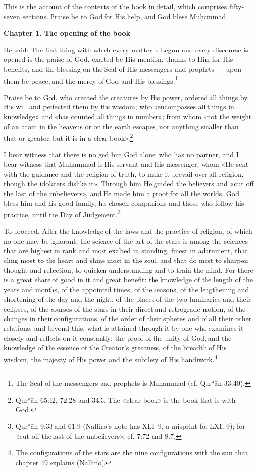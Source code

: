 \documentclass[11pt]{article}
\newcommand{\ArPage}[1]{\marginpar{\footnotesize\color{gray}Ar.\,p.\,#1}}
\newcommand{\ChapterHead}[4]{\par\needspace{8\baselineskip}\bigskip\pdfbookmark[1]{#1}{ch-#2}\hypertarget{EN-C#2}{}%
 {\large\bfseries\interlinepenalty=10000 #1#4{\normalfont\normalsize#3}\par}\nobreak\medskip}
\begin{document}
\par This is the account of the contents of the book in detail, which comprises fifty-seven sections. Praise be to God for His help, and God bless Muḥammad.\par
\ChapterHead{Chapter 1. The opening of the book}{01}{\ArPage{6}}{}
\par He said: The first thing with which every matter is begun and every discourse is opened is the praise of God, exalted be His mention, thanks to Him for His benefits, and the blessing on the Seal of His messengers and prophets — upon them be peace, and the mercy of God and His blessings.\footnote{The Seal of the messengers and prophets is Muḥammad (cf. Qurʾān 33:40).}\par
\par Praise be to God, who created the creatures by His power, ordered all things by His will and perfected them by His wisdom; who «encompasses all things in knowledge» and «has counted all things in number»; from whom «not the weight of an atom in the heavens or on the earth escapes, nor anything smaller than that or greater, but it is in a clear book».\footnote{Qurʾān 65:12, 72:28 and 34:3. The «clear book» is the book that is with God.}\par
\par I bear witness that there is no god but God alone, who has no partner, and I bear witness that Muḥammad is His servant and His messenger, whom «He sent with the guidance and the religion of truth, to make it prevail over all religion, though the idolaters dislike it». Through him He guided the believers and «cut off the last of the unbelievers», and He made him a proof for all the worlds. God bless him and his good family, his chosen companions and those who follow his practice, until the Day of Judgement.\footnote{Qurʾān 9:33 and 61:9 (Nallino's note has XLI, 9, a misprint for LXI, 9); for «cut off the last of the unbelievers», cf. 7:72 and 8:7.}\par
\par To proceed. After the knowledge of the laws and the practice of religion, of which no one may be ignorant, the science of the art of the stars is among the sciences that are highest in rank and most exalted in standing, finest in adornment, that cling most to the heart and shine most in the soul, and that do most to sharpen thought and reflection, to quicken understanding and to train the mind. For there is a great share of good in it and great benefit: the knowledge of the length of the years and months, of the appointed times, of the seasons, of the lengthening and shortening of the day and the night, of the places of the two luminaries and their eclipses, of the courses of the stars in their direct and retrograde motion, of the changes in their configurations, of the order of their spheres and of all their other relations; and beyond this, what is attained through it by one who examines it closely and reflects on it constantly: the proof of the unity of God, and the knowledge of the essence of the Creator's greatness, of the breadth of His wisdom, the majesty of His power and the subtlety of His handiwork.\footnote{The configurations of the stars are the nine configurations with the sun that chapter 49 explains (Nallino).}\par
\end{document}
